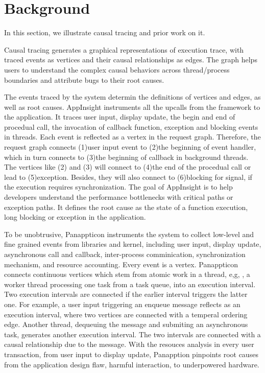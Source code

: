 \section{Background} \label{sec:background}

In this section, we illustrate causal tracing and prior work on it.

Causal tracing generates a graphical representations of execution trace, with
traced events as vertices and their causal relationships as edges. The graph
helps users to understand the complex causal behaviors across thread/process
boundaries and attribute bugs to their root causes.

The events traced by the system determin the definitions of vertices and edges,
as well as root causes. AppInsight instruments all the upcalls from the
framework to the application. It traces user input, display update, the begin
and end of procedual call, the invocation of callback function, exception and
blocking events in threads. Each event is reflected as a vertex in the request
graph. Therefore, the request graph connects (1)user input event to (2)the
beginning of event handler, which in turn connects to (3)the beginning of
callback in background threads. The vertices like (2) and (3) will connect to
(4)the end of the procedual call or lead to (5)exception. Besides, they will
also connect to (6)blocking for signal, if the execution requires
synchronization. The goal of AppInsight is to help developers understand the
performance bottlenecks with critical paths or exception paths. It defines the
root cause as the state of a function execution, long blocking or exception in
the application.

To be unobtrusive, Panappticon instruments the system to collect low-level and
fine grained events from libraries and kernel, including user input, display
update, asynchronous call and callback, inter-process comminication,
synchronization mechanism, and resource accounting. Every event is a vertex.
Panappticon connects continuous vertices which stem from atomic work in a
thread, e,g, , a worker thread processing one task from a task queue, into an
execution interval. Two execution intervals are connected if the earlier interval
triggers the latter one. For example, a user input triggering an enqueue
message reflects as an execution interval, where two vertices are connected
with a temperal ordering edge. Another thread, dequeuing the message and
submiting an asynchronous task, generates another execution interval. The two
intervals are connected with a causal relationship due to the message. With the
resouces analysis in every user transaction, from user input to display update,
Panapption pinpoints root causes from the application design flaw, harmful
interaction, to underpowered hardware.

